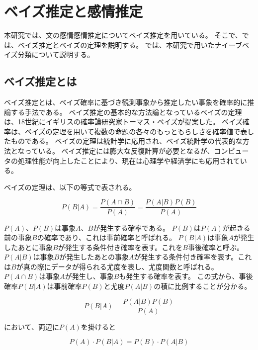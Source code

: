 \documentclass[11pt,a4j]{jsarticle}
\begin{document}

\section{ベイズ推定と感情推定}\label{sec:def}
本研究では、文の感情感情推定についてベイズ推定を用いている。
そこで、では、ベイズ推定とベイズの定理を説明する。
では、本研究で用いたナイーブベイズ分類について説明する。

  \subsection{ベイズ推定とは}\label{sec:defbayes}
ベイズ推定とは、ベイズ確率に基づき観測事象から推定したい事象を確率的に推論する手法である。
ベイズ推定の基本的な方法論となっているベイズの定理は、18世紀にイギリスの確率論研究家トーマス・ベイズが提案した。
ベイズ確率は、ベイズの定理を用いて複数の命題の各々のもっともらしさを確率値で表したものである。
ベイズの定理は統計学に応用され、ベイズ統計学の代表的な方法となっている。
ベイズ推定には膨大な反復計算が必要となるが、コンピュータの処理性能が向上したことにより、現在は心理学や経済学にも応用されている。

ベイズの定理は、以下の等式で表される。

\[
P(B|A)=\frac{P(A \cap B)}{P(A)}=\frac{P(A|B)P(B)}{P(A)}
\]


$P(A)$、$P(B)$は事象$A$、$B$が発生する確率である。
$P(B)$は$P(A)$が起きる前の事象$B$の確率であり、これは事前確率と呼ばれる。
$P(B|A)$は事象$A$が発生したあとに事象$B$が発生する条件付き確率を表す。これを$B$事後確率と呼ぶ。
$P(A|B)$は事象$B$が発生したあとの事象$A$が発生する条件付き確率を表す。これは$B$が真の際にデータが得られる尤度を表し、尤度関数と呼ばれる。
$P(A \cap B)$は事象$A$が発生し、事象$B$も発生する確率を表す。
この式から、事後確率$P(B|A)$は事前確率$P(B)$と尤度$P(A|B)$の積に比例することが分かる。



\begin{equation}
P(B|A)=\frac{P(A|B)P(B)}{P(A)}
\end{equation}

において、両辺に$P(A)$を掛けると

\begin{equation}
P(A) \cdot P(B|A)=P(B) \cdot P(A|B)
\end{equation}
\end{document}
